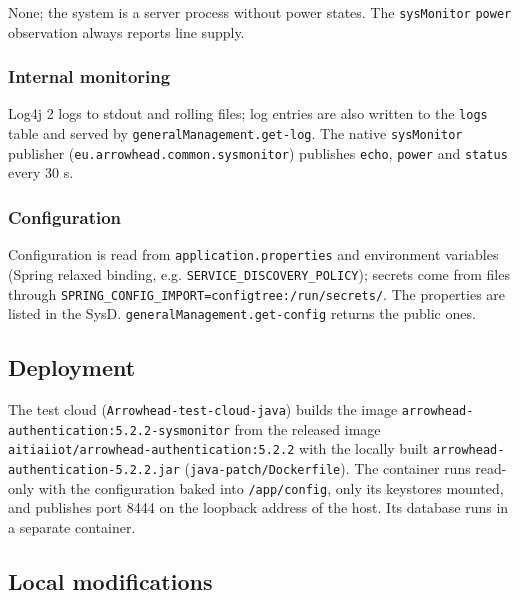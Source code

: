 \documentclass[a4paper]{arrowhead}
\begin{document}
None; the system is a server process without power states. The \texttt{sysMonitor} \texttt{power} observation always reports line supply.

\subsubsection{Internal monitoring}

Log4j 2 logs to stdout and rolling files; log entries are also written to the \texttt{logs} table and served by \texttt{generalManagement.get-log}. The native \texttt{sysMonitor} publisher (\texttt{eu.arrowhead.common.sysmonitor}) publishes \texttt{echo}, \texttt{power} and \texttt{status} every 30 s.

\subsubsection{Configuration}

Configuration is read from \texttt{application.properties} and environment variables (Spring relaxed binding, e.g. \texttt{SERVICE\_DISCOVERY\_POLICY}); secrets come from files through \texttt{SPRING\_CONFIG\_IMPORT=configtree:/run/secrets/}. The properties are listed in the SysD. \texttt{generalManagement.get-config} returns the public ones.

\subsection{Deployment}

The test cloud (\texttt{Arrowhead-test-cloud-java}) builds the image \texttt{arrowhead-\allowbreak{}authentication:5.\allowbreak{}2.\allowbreak{}2-\allowbreak{}sysmonitor} from the released image \texttt{aitiaiiot/\allowbreak{}arrowhead-\allowbreak{}authentication:5.\allowbreak{}2.\allowbreak{}2} with the locally built \texttt{arrowhead-\allowbreak{}authentication-\allowbreak{}5.\allowbreak{}2.\allowbreak{}2.\allowbreak{}jar} (\texttt{java-patch/Dockerfile}). The container runs read-only with the configuration baked into \texttt{/app/config}, only its keystores mounted, and publishes port 8444 on the loopback address of the host. Its database runs in a separate container.

\subsection{Local modifications}
\label{sec:local}
\end{document}
